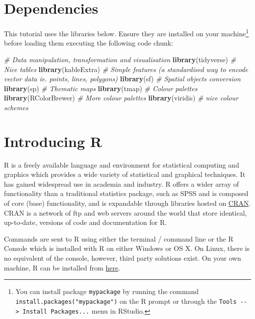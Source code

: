 \documentclass[]{book}
\newenvironment{Shaded}{\begin{snugshade}}{\end{snugshade}}
\newcommand{\CommentTok}[1]{\textcolor[rgb]{0.56,0.35,0.01}{\textit{#1}}}
\newcommand{\KeywordTok}[1]{\textcolor[rgb]{0.13,0.29,0.53}{\textbf{#1}}}
\newcommand{\NormalTok}[1]{#1}
\let\rmarkdownfootnote\footnote%
\def\footnote{\protect\rmarkdownfootnote}
\begin{document}
\hypertarget{dependencies}{%
\section{Dependencies}\label{dependencies}}

This tutorial uses the libraries below. Ensure they are installed on your machine\footnote{You can install package \texttt{mypackage} by running the command \texttt{install.packages("mypackage")} on the R prompt or through the \texttt{Tools\ -\/-\textgreater{}\ Install\ Packages...} menu in RStudio.} before loading them executing the following code chunk:

\begin{Shaded}
\begin{Highlighting}[]
\CommentTok{# Data manipulation, transformation and visualisation}
\KeywordTok{library}\NormalTok{(tidyverse)}
\CommentTok{# Nice tables}
\KeywordTok{library}\NormalTok{(kableExtra)}
\CommentTok{# Simple features (a standardised way to encode vector data ie. points, lines, polygons)}
\KeywordTok{library}\NormalTok{(sf) }
\CommentTok{# Spatial objects conversion}
\KeywordTok{library}\NormalTok{(sp) }
\CommentTok{# Thematic maps}
\KeywordTok{library}\NormalTok{(tmap) }
\CommentTok{# Colour palettes}
\KeywordTok{library}\NormalTok{(RColorBrewer) }
\CommentTok{# More colour palettes}
\KeywordTok{library}\NormalTok{(viridis) }\CommentTok{# nice colour schemes}
\end{Highlighting}
\end{Shaded}

\hypertarget{introducing-r}{%
\section{Introducing R}\label{introducing-r}}

R is a freely available language and environment for statistical computing and graphics which provides a wide variety of statistical and graphical techniques. It has gained widespread use in academia and industry. R offers a wider array of functionality than a traditional statistics package, such as SPSS and is composed of core (base) functionality, and is expandable through libraries hosted on \href{https://cran.r-project.org}{CRAN}. CRAN is a network of ftp and web servers around the world that store identical, up-to-date, versions of code and documentation for R.

Commands are sent to R using either the terminal / command line or the R Console which is installed with R on either Windows or OS X. On Linux, there is no equivalent of the console, however, third party solutions exist. On your own machine, R can be installed from \href{https://www.r-project.org/}{here}.
\end{document}
